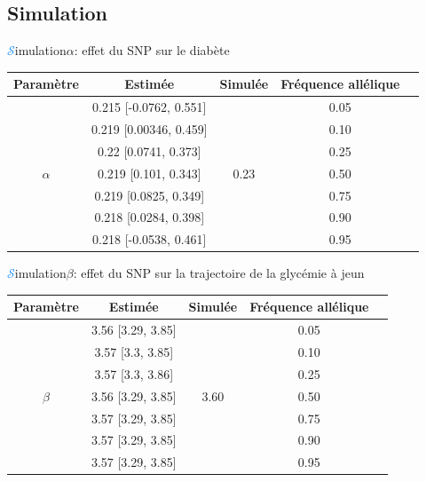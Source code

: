 \subsection{Simulation}
\begin{frame}{{\huge\textcolor{dodgerblue}{$\mathcal{S}$}}imulation}{$\alpha$: effet du SNP sur le diabète}
    {\small \begin{center}
        \begin{tabular}{ccccc}
            \hline
            Paramètre & Estimée & Simulée & Fréquence allélique\\
            \hline
            \multirow{7}{*}{$\alpha$} & \textcolor{maroon2}{0.215 [-0.0762, 0.551]} & \multirow{7}{*}{0.23} & 0.05 \\
             & 0.219 [0.00346, 0.459] &  & 0.10 \\
             & 0.22 [0.0741, 0.373] &  & 0.25 \\
             & 0.219 [0.101, 0.343] &  & 0.50 \\
             & 0.219 [0.0825, 0.349] &  & 0.75 \\
             & 0.218 [0.0284, 0.398] &  & 0.90 \\
             & \textcolor{maroon2}{0.218 [-0.0538, 0.461]} &  & 0.95 \\
            \hline
        \end{tabular}
    \end{center}}
\end{frame}
\begin{frame}{{\huge\textcolor{dodgerblue}{$\mathcal{S}$}}imulation}{$\beta$: effet du SNP sur la trajectoire de la glycémie à jeun}
    {\small \begin{center}
        \begin{tabular}{ccccc}
            \hline
            Paramètre & Estimée & Simulée & Fréquence allélique\\
            \hline
            \multirow{7}{*}{$\beta$} & 3.56 [3.29, 3.85] & \multirow{7}{*}{3.60} & 0.05 \\
             & 3.57 [3.3, 3.85] &  & 0.10 \\
             & 3.57 [3.3, 3.86] &  & 0.25 \\
             & 3.56 [3.29, 3.85] &  & 0.50 \\
             & 3.57 [3.29, 3.85] &  & 0.75 \\
             & 3.57 [3.29, 3.85] &  & 0.90 \\
             & 3.57 [3.29, 3.85] &  & 0.95 \\
            \hline
        \end{tabular}
    \end{center}}
\end{frame}
